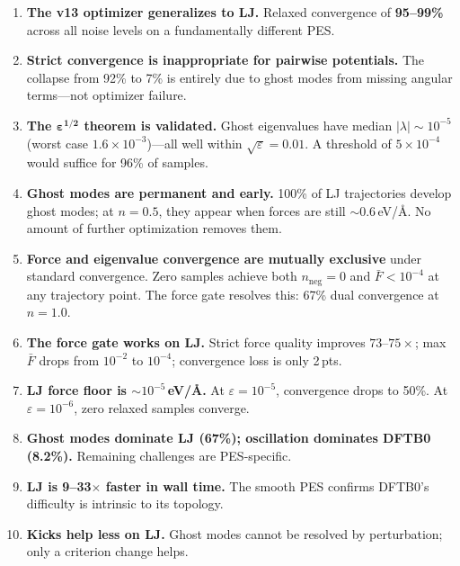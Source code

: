 \documentclass[11pt,a4paper]{article}
\newcommand{\hlnum}[1]{{\Large\bfseries\color{ljblue}#1}}
\theoremstyle{definition}
\begin{document}
\begin{tcolorbox}[keyresult, title=Summary of Findings]
\begin{enumerate}[leftmargin=*]
  \item \textbf{The v13 optimizer generalizes to LJ.}  Relaxed
    convergence of \hlnum{95--99\%} across all noise levels on a
    fundamentally different PES.

  \item \textbf{Strict convergence is inappropriate for pairwise
    potentials.}  The collapse from 92\% to 7\% is entirely due to ghost
    modes from missing angular terms---not optimizer failure.

  \item \textbf{The $\bm{\varepsilon^{1/2}}$ theorem is validated.}
    Ghost eigenvalues have median $|\lambda| \sim 10^{-5}$
    (worst case $1.6 \times 10^{-3}$)---all well within
    $\sqrt{\varepsilon} = 0.01$.  A threshold of $5 \times 10^{-4}$
    would suffice for 96\% of samples.

  \item \textbf{Ghost modes are permanent and early.}  100\% of LJ
    trajectories develop ghost modes; at $n{=}0.5$, they appear when
    forces are still ${\sim}0.6$\,eV/\AA.  No amount of further
    optimization removes them.

  \item \textbf{Force and eigenvalue convergence are mutually exclusive}
    under standard convergence.  Zero samples achieve both
    $n_\text{neg}{=}0$ and $\bar{F} < 10^{-4}$ at any trajectory point.
    The force gate resolves this: 67\% dual convergence at $n{=}1.0$.

  \item \textbf{The force gate works on LJ.}  Strict force quality
    improves $73$--$75\times$; max $\bar{F}$ drops from $10^{-2}$ to
    $10^{-4}$; convergence loss is only 2\,pts.

  \item \textbf{LJ force floor is ${\sim}10^{-5}$\,eV/\AA.}  At
    $\varepsilon = 10^{-5}$, convergence drops to 50\%.  At
    $\varepsilon = 10^{-6}$, zero relaxed samples converge.

  \item \textbf{Ghost modes dominate LJ (67\%); oscillation dominates
    DFTB0 (8.2\%).}  Remaining challenges are PES-specific.

  \item \textbf{LJ is 9--33$\times$ faster in wall time.}  The smooth
    PES confirms DFTB0's difficulty is intrinsic to its topology.

  \item \textbf{Kicks help less on LJ.}  Ghost modes cannot be resolved
    by perturbation; only a criterion change helps.
\end{enumerate}
\end{tcolorbox}
\end{document}
